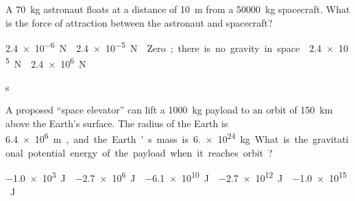 \documentclass{../../oss-apphys-exam}
\begin{document}



\raggedcolumns
\begin{multicols*}{2}
  \begin{questions}
    \question A \SI{70}{\kilo\gram} astronaut floats at a distance of
    \SI{10}{\metre} from a \SI{50000}{\kilo\gram} spacecraft. What is the force
    of attraction between the astronaut and spacecraft?
    \begin{choices}
      \choice\SI{2.4e-6}\newton
      \choice\SI{2.4e-5}\newton
      \choice Zero; there is no gravity in space.
      \choice\SI{2.4e5}\newton
      \choice\SI{2.4e6}\newton
    \end{choices}
    \vspace{.5in}
    
s%
    
    \question A proposed ``space elevator'' can lift a \SI{1000}{\kilo\gram}
    payload to an orbit of \SI{150}{\kilo\metre} above the Earth's surface. The
    radius of the Earth is \SI{6.4e6}\metre, and the Earth's mass is
    \SI{6.e24}{\kilo\gram}. What is the gravitational potential energy of the
    payload when it reaches orbit?
    \begin{choices}
      \choice\SI{-1.0e3}\joule
      \choice\SI{-2.7e6}\joule
      \choice\SI{-6.1e10}\joule
      \choice\SI{-2.7e12}\joule
      \choice\SI{-1.0e15}\joule
    \end{choices}
    
%    


\end{questions}
\end{multicols*}
\end{document}
